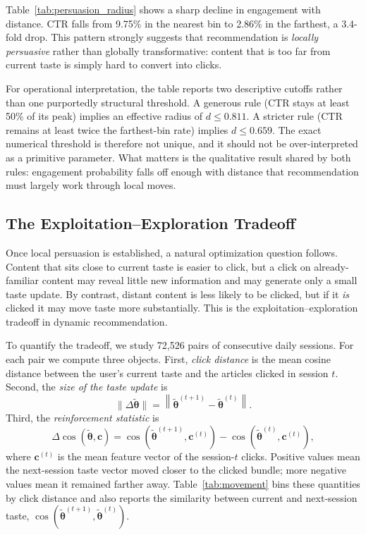 \documentclass[11pt]{article}
\begin{document}
Table~\ref{tab:persuasion_radius} shows a sharp decline in engagement with distance. CTR falls from 9.75\% in the nearest bin to 2.86\% in the farthest, a 3.4-fold drop. This pattern strongly suggests that recommendation is \emph{locally persuasive} rather than globally transformative: content that is too far from current taste is simply hard to convert into clicks.

For operational interpretation, the table reports two descriptive cutoffs rather than one purportedly structural threshold. A generous rule (CTR stays at least 50\% of its peak) implies an effective radius of $d \le 0.811$. A stricter rule (CTR remains at least twice the farthest-bin rate) implies $d \le 0.659$. The exact numerical threshold is therefore not unique, and it should not be over-interpreted as a primitive parameter. What matters is the qualitative result shared by both rules: engagement probability falls off enough with distance that recommendation must largely work through local moves.

\subsection{The Exploitation--Exploration Tradeoff}
\label{sec:tradeoff}

Once local persuasion is established, a natural optimization question follows. Content that sits close to current taste is easier to click, but a click on already-familiar content may reveal little new information and may generate only a small taste update. By contrast, distant content is less likely to be clicked, but if it \emph{is} clicked it may move taste more substantially. This is the exploitation--exploration tradeoff in dynamic recommendation.

To quantify the tradeoff, we study 72,526 pairs of consecutive daily sessions. For each pair we compute three objects. First, \emph{click distance} is the mean cosine distance between the user's current taste and the articles clicked in session $t$. Second, the \emph{size of the taste update} is
\[
\|\Delta\tilde{\boldsymbol{\theta}}\|
=
\left\|
\tilde{\boldsymbol{\theta}}^{(t+1)}
-
\tilde{\boldsymbol{\theta}}^{(t)}
\right\|.
\]
Third, the \emph{reinforcement statistic} is
\[
\Delta\cos(\tilde{\boldsymbol{\theta}},\mathbf{c})
=
\cos\!\left(\tilde{\boldsymbol{\theta}}^{(t+1)},\mathbf{c}^{(t)}\right)
-
\cos\!\left(\tilde{\boldsymbol{\theta}}^{(t)},\mathbf{c}^{(t)}\right),
\]
where $\mathbf{c}^{(t)}$ is the mean feature vector of the session-$t$ clicks. Positive values mean the next-session taste vector moved closer to the clicked bundle; more negative values mean it remained farther away. Table~\ref{tab:movement} bins these quantities by click distance and also reports the similarity between current and next-session taste, $\cos(\tilde{\boldsymbol{\theta}}^{(t+1)},\tilde{\boldsymbol{\theta}}^{(t)})$.
\end{document}
